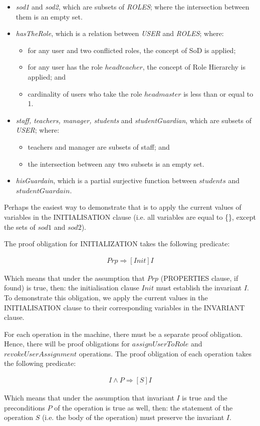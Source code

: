 \begin{itemize}
\item \emph{sod1} and \emph{sod2}, which are subsets of \emph{ROLES}; where the intersection between them is an empty set.
\item	\emph{hasTheRole}, which is a relation between \emph{USER} and \emph{ROLES}; where:
\begin{itemize}
\item for any user and two conflicted roles, the concept of SoD is applied;
\item for any user has the role $headteacher$, the concept of Role Hierarchy is applied; and
\item cardinality of users who take the role $headmaster$ is less than or equal to 1. 
\end{itemize}
\item	\emph{staff, teachers, manager, students} and \emph{studentGuardian}, which are subsets of \emph{USER}; where:
\begin{itemize}
\item	teachers and manager are subsets of staff; and
\item	the intersection between any two subsets is an empty set.
\end{itemize}
\item \emph{hisGuardain}, which is a partial surjective function between $students$ and $studentGuardain$.

\end{itemize}

Perhaps the easiest way to demonstrate that is to apply the current values of variables in the INITIALISATION clause (i.e. all variables are equal to \{\}, except the sets of $sod1$ and $sod2$).  

      
      The proof obligation for INITIALIZATION takes the following predicate: 

\begin{align*}
Prp \Rightarrow[Init] I
\end{align*}



Which means that under the assumption that $Prp$ (PROPERTIES clause, if found) is true, then: the initialisation clause $Init$ must establish the invariant $I$.  To demonstrate this obligation, we apply the current values in the INITIALISATION clause to their corresponding variables in the INVARIANT clause.

For each operation in the machine, there must be a separate proof obligation.  Hence, there will be proof obligations for $assignUserToRole$ and $revokeUserAssignment$ operations.  The proof obligation of each operation takes the following predicate: 

\begin{align*}
I \wedge P \Rightarrow [S] I
\end{align*}



Which means that under the assumption that invariant $I$ is true and the preconditions $P$ of the operation is true as well, then: the statement of the operation $S$ (i.e. the body of the operation) must preserve the invariant $I$.
